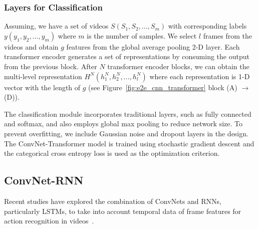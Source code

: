 \documentclass[fleqn,10pt]{wlscirep}
\begin{document}
\subsubsection{Layers for Classification}
Assuming, we have a set of videos $S(S_1,S_2,...,S_m)$ with corresponding labels $y(y_1,y_2,...,y_m)$ where $m$ is the number of samples. We select $l$ frames from the videos and obtain $g$ features from the global average pooling 2-D layer. Each transformer encoder generates a set of representations by consuming the output from the previous block. After $N$ transformer encoder blocks, we can obtain the multi-level representation $H^N(h^N_1,h^N_2,...,h^N_l)$ where each representation is 1-D vector with the length of $g$ (see Figure~\ref{fig:e2e_cnn_transformer} block (A) $\rightarrow$ (D)). 



The classification module incorporates traditional layers, such as fully connected and softmax, and also employs global max pooling to reduce network size. To prevent overfitting, we include Gaussian noise and dropout layers in the design. The ConvNet-Transformer model is trained using stochastic gradient descent and the categorical cross entropy loss is used as the optimization criterion.
\subsection{ConvNet-RNN}
\label{sec:convrnn}




Recent studies have explored the combination of ConvNets and RNNs, particularly LSTMs, to take into account temporal data of frame features for action recognition in videos~\cite{donahue2015long,yue2015beyond,ullah2017action,he2021db,ullah2018action,chen2021lstm}.
\end{document}
